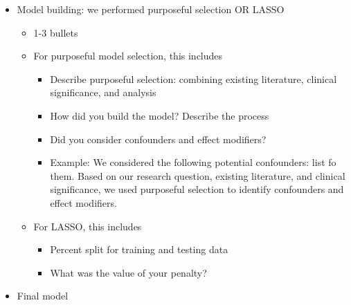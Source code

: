 \documentclass[
  letterpaper,
  DIV=11,
  numbers=noendperiod]{scrartcl}
\providecommand{\tightlist}{%
  \setlength{\itemsep}{0pt}\setlength{\parskip}{0pt}}\usepackage{longtable,booktabs,array}
\begin{document}
\begin{itemize}
\begin{itemize}
\begin{itemize}
      \begin{itemize}
      \tightlist
      \item
        Indicators for gender identity or race
      \item
        Creating BMI
      \item
        Categorizing a continuous variable (even if performed in model
        selection)
      \item
        Using scoring for an ordered categorical variable (that is not
        your explanatory variable)
      \end{itemize}
    \item
      1 bullet for all variables
    \end{itemize}
  \item
    Model building: we performed purposeful selection OR LASSO

    \begin{itemize}
    \tightlist
    \item
      1-3 bullets
    \item
      {For purposeful model selection}, this includes

      \begin{itemize}
      \tightlist
      \item
        Describe purposeful selection: combining existing literature,
        clinical significance, and analysis
      \item
        How did you build the model? Describe the process
      \item
        Did you consider confounders and effect modifiers?
      \item
        Example: We considered the following potential confounders: list
        fo them. Based on our research question, existing literature,
        and clinical significance, we used purposeful selection to
        identify confounders and effect modifiers.
      \end{itemize}
    \item
      {For LASSO}, this includes

      \begin{itemize}
      \tightlist
      \item
        Percent split for training and testing data
      \item
        What was the value of your penalty?
      \end{itemize}
    \end{itemize}
  \item
    Final model


\end{itemize}
\end{itemize}
\end{document}
